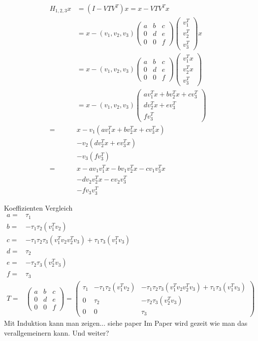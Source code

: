\begin{align*}
  H_{1,2,3} x &= (I - V T V^T) x = x - V T V^T x\\
  &= x - (v_1, v_2, v_3)
  \begin{pmatrix}
    a & b & c\\ 
    0 & d & e\\
    0 & 0 & f
  \end{pmatrix}
  \begin{pmatrix}
    v_1^T \\ v_2^T \\ v_3^T
  \end{pmatrix}
  x\\
  &= x - (v_1, v_2, v_3)
  \begin{pmatrix}
    a & b & c\\ 
    0 & d & e\\
    0 & 0 & f
  \end{pmatrix}
  \begin{pmatrix}
    v_1^T x \\ v_2^T x \\ v_3^T
  \end{pmatrix}\\
  &= x - (v_1, v_2, v_3)
  \begin{pmatrix}
    a v_1^T x + b v_2^T x + c v_3^T\\ 
    d v_2^T x + e v_3^T \\
    f v_3^T
  \end{pmatrix}\\
  =& x - v_1(a v_1^T x + b v_2^T x + c v_3^T x) \\ 
   & - v_2 ( d v_2^T x + e v_3^T x) \\ 
   & - v_3 ( f v_3^T ) \\
  =& x - a v_1 v_1^T x - b v_1 v_2^T x - c v_1 v_3^T x \\
   & - d v_2 v_2^T x - e v_2 v_3^T \\
   & - f v_3 v_3^T
\end{align*}

Koeffizienten Vergleich
\begin{align*}
	a =&  \tau_1\\
	b =& -\tau_1 \tau_2 (v_1^T v_2 ) \\
	c =& -\tau_1 \tau_2  \tau_3 (v_1^T v_2 v_2^T v_3) + \tau_1 \tau_3  (v_1^T v_3)\\
	d =&  \tau_2 \\
	e =& -\tau_2 \tau_3  (v_2^T v_3)\\
    f =&  \tau_3\\
	T =&
	\begin{pmatrix}
	a & b & c\\ 
	0 & d & e\\
	0 & 0 & f
	\end{pmatrix} =
	\begin{pmatrix}
		\tau_1 & -\tau_1 \tau_2 (v_1^T v_2 ) & - \tau_1 \tau_2  \tau_3 (v_1^T v_2 v_2^T v_3) + \tau_1 \tau_3  (v_1^T v_3)\\ 
		0 & \tau_2 &  -\tau_2 \tau_3  (v_2^T v_3)\\
		0 & 0 & \tau_3
	\end{pmatrix}
\end{align*}
Mit Induktion kann man zeigen... siehe paper
Im Paper wird gezeit wie man das verallgemeinern kann.
Und weiter?
\newpage
